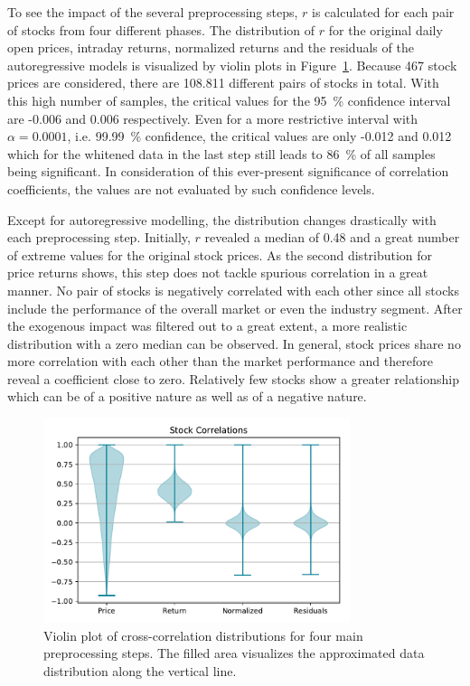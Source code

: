 To see the impact of the several preprocessing steps, $r$ is calculated for each pair of stocks from four different phases. The distribution of $r$ for the original daily open prices, intraday returns, normalized returns and the residuals of the autoregressive models is visualized by violin plots in Figure~\ref{fig:steps-correlations-ind}. Because 467 stock prices are considered, there are 108.811 different pairs of stocks in total. With this high number of samples, the critical values for the 95~\% confidence interval are -0.006 and 0.006 respectively. Even for a more restrictive interval with $\alpha = 0.0001$, i.e. 99.99~\% confidence, the critical values are only -0.012 and 0.012 which for the whitened data in the last step still leads to 86~\% of all samples being significant. In consideration of this ever-present significance of correlation coefficients, the values are not evaluated by such confidence levels.


Except for autoregressive modelling, the distribution changes drastically with each preprocessing step. Initially, $r$ revealed a median of 0.48 and a great number of extreme values for the original stock prices. As the second distribution for price returns shows, this step does not tackle spurious correlation in a great manner. No pair of stocks is negatively correlated with each other since all stocks include the performance of the overall market or even the industry segment. After the exogenous impact was filtered out to a great extent, a more realistic distribution with a zero median can be observed. In general, stock prices share no more correlation with each other than the market performance and therefore reveal a coefficient close to zero. Relatively few stocks show a greater relationship which can be of a positive nature as well as of a negative nature.

\begin{figure}[!ht]
    \centering
    \includegraphics[width=0.8\textwidth]{figures/regression/steps-correlations-ind-norm.pdf}
    \caption{Violin plot of cross-correlation distributions for four main preprocessing steps. The filled area visualizes the approximated data distribution along the vertical line.}
    \label{fig:steps-correlations-ind}
\end{figure}

